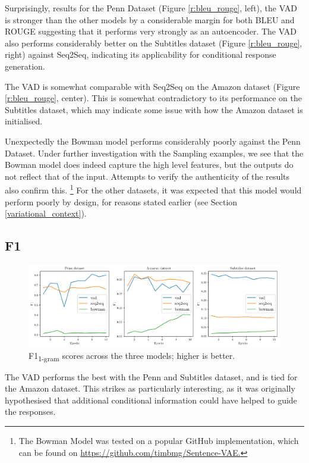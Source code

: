 \documentclass[12pt,twoside]{report}
\begin{document}
Surprisingly, results for the Penn Dataset (Figure \ref{r:bleu_rouge}, left), the VAD is stronger than the other models by a considerable margin for both BLEU and ROUGE suggesting that it performs very strongly as an autoencoder. The VAD also performs considerably better on the Subtitles dataset  (Figure \ref{r:bleu_rouge}, right) against Seq2Seq, indicating its applicability for conditional response generation.

The VAD is somewhat comparable with Seq2Seq on the Amazon dataset  (Figure \ref{r:bleu_rouge}, center). This is somewhat contradictory to its performance on the Subtitles dataset, which may indicate some issue with how the Amazon dataset is initialised.

Unexpectedly the Bowman model performs considerably poorly against the Penn Dataset. Under further investigation with the Sampling examples, we see that the Bowman model does indeed capture the high level features, but the outputs do not reflect that of the input. Attempts to verify the authenticity of the results also confirm this. \footnote{The Bowman Model was tested on a popular GitHub implementation, which can be found on \href{https://github.com/timbmg/Sentence-VAE}{https://github.com/timbmg/Sentence-VAE.}
} For the other datasets, it was expected that this model would perform poorly by design, for reasons stated earlier (see Section \ref{variational_context}). 

\subsection{F1}

\begin{figure}[!ht]
	\centering
	\includegraphics[width=150mm]{results/f1.pdf}
	\caption{F1\textsubscript{1-gram} scores across the three models; higher is better.\label{r:f1}}
	\end{figure}
	
The VAD performs the best with the Penn and Subtitles dataset, and is tied for the Amazon dataset. This strikes as particularly interesting, as it was originally hypothesised that additional conditional information could have helped to guide the responses.
\end{document}
